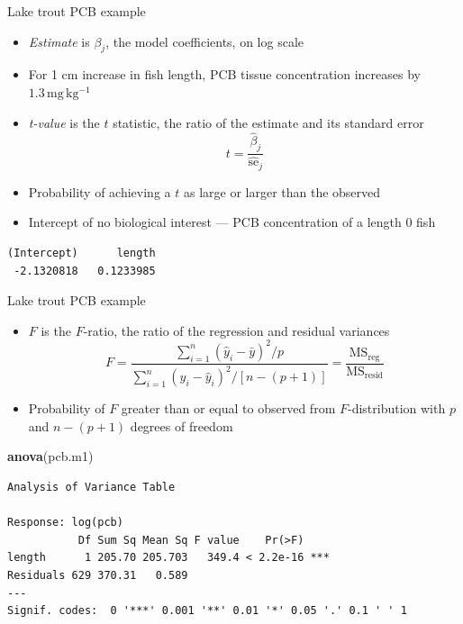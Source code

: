 \documentclass[10pt,ignorenonframetext,compress, aspectratio=169]{beamer}
\newenvironment{Shaded}{\begin{snugshade}}{\end{snugshade}}
\newcommand{\KeywordTok}[1]{\textcolor[rgb]{0.13,0.29,0.53}{\textbf{{#1}}}}
\newcommand{\NormalTok}[1]{{#1}}
\providecommand{\tightlist}{%
  \setlength{\itemsep}{0pt}\setlength{\parskip}{0pt}}
\begin{document}
\begin{frame}[fragile]{Lake trout PCB example}

\begin{itemize}
\tightlist
\item
  \emph{Estimate} is \(\beta_j\), the model coefficients, on log scale
\item
  For 1 cm increase in fish length, PCB tissue concentration increases
  by \(\mathrm{1.3 \, mg \, kg^{-1}}\)
\item
  \emph{t-value} is the \(t\) statistic, the ratio of the estimate and
  its standard error \[t = \frac{\hat{\beta}_j}{\hat{\mathrm{se}}_j}\]
\item
  Probability of achieving a \(t\) as large or larger than the observed
\item
  Intercept of no biological interest --- PCB concentration of a length
  0 fish
\end{itemize}

\scriptsize

\begin{verbatim}
(Intercept)      length 
 -2.1320818   0.1233985 
\end{verbatim}

\normalsize

\end{frame}

\begin{frame}[fragile]{Lake trout PCB example}

\begin{itemize}
\tightlist
\item
  \(F\) is the \(F\)-ratio, the ratio of the regression and residual
  variances
  \[F = \frac{\sum\limits^n_{i=1}(\hat{y}_i - \bar{y})^2 / p}{\sum\limits^n_{i=1}(y_i - \hat{y}_i)^2 / [n-(p+1)]} = \frac{\mathrm{MS_{reg}}}{\mathrm{MS_{resid}}}\]
\item
  Probability of \(F\) greater than or equal to observed from
  \(F\)-distribution with \(p\) and \(n - (p + 1)\) degrees of freedom
\end{itemize}

\scriptsize

\begin{Shaded}
\begin{Highlighting}[]
\KeywordTok{anova}\NormalTok{(pcb.m1)}
\end{Highlighting}
\end{Shaded}

\begin{verbatim}
Analysis of Variance Table

Response: log(pcb)
           Df Sum Sq Mean Sq F value    Pr(>F)    
length      1 205.70 205.703   349.4 < 2.2e-16 ***
Residuals 629 370.31   0.589                      
---
Signif. codes:  0 '***' 0.001 '**' 0.01 '*' 0.05 '.' 0.1 ' ' 1
\end{verbatim}

\normalsize

\end{frame}
\end{document}
